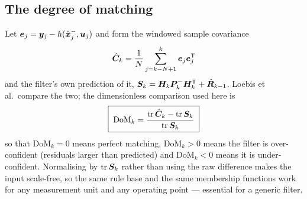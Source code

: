 \subsection{The degree of matching}
Let $\bm{e}_j=\bm{y}_j-h(\hat{\bm{x}}^{-}_j,\bm{u}_j)$ and form the windowed sample covariance
\begin{equation}
\hat{\bm{C}}_k = \frac{1}{N}\sum_{j=k-N+1}^{k}\bm{e}_j\bm{e}_j^{\mathsf{T}}
\label{eq:fz:C}
\end{equation}
and the filter's own prediction of it,
$\bm{S}_k = \bm{H}_k\bm{P}^{-}_k\bm{H}_k^{\mathsf{T}} + \hat{\bm{R}}_{k-1}$.  Loebis et al.\ compare the two; the
dimensionless comparison used here is
\begin{equation}
\boxed{\;\mathrm{DoM}_k = \frac{\operatorname{tr}\hat{\bm{C}}_k - \operatorname{tr}\bm{S}_k}{\operatorname{tr}\bm{S}_k}\;}
\label{eq:fz:dom}
\end{equation}
so that $\mathrm{DoM}_k=0$ means perfect matching, $\mathrm{DoM}_k>0$ means the filter is
over-confident (residuals larger than predicted) and $\mathrm{DoM}_k<0$ means it is
under-confident.  Normalising by $\operatorname{tr}\bm{S}_k$ rather than using the raw difference makes the input
scale-free, so the same rule base and the same membership functions work for any measurement unit
and any operating point --- essential for a generic filter.

